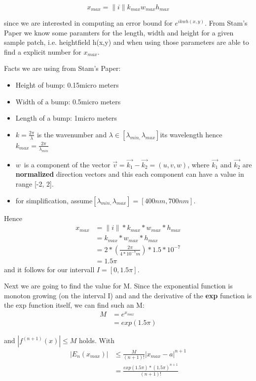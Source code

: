 \begin{equation*}
 x_{max} = \|i\| k_{max} w_{max} h_{max}
\end{equation*}

since we are interested in computing an error bound for $e^{ikwh(x,y)}$.
From Stam's Paper we know some paramters for the length, width and height for a given sample patch, i.e. heightfield
h(x,y) and when using those parameters are able to find a explicit
number for $x_{max}$.

Facts we are using from Stam's Paper:

\begin{itemize}
\item Height of bump: 0.15micro meters
\item Width of a bump: 0.5micro meters
\item Length of a bump: 1micro meters
\item $k=\frac{2\pi}{\lambda}$ is the wavenumber and $\lambda\in[\lambda_{min,}\lambda_{max}]$its
wavelength hence $k_{max}=\frac{2\pi}{\lambda_{min}}$ 
\item $w$~is a component of the vector $\vec{v}=\vec{k_{1}}-\vec{k_{2}}=(u,v,w)$,
where $\vec{k_{1}}$ and $\vec{k_{2}}$ are \textbf{normalized} direction
vectors and this each component can have a value in range {[}-2, 2{]}.
\item for simplification, assume$[\lambda_{min,}\lambda_{max}]=[400nm,700nm].$
\end{itemize}

Hence 
\begin{align*}
x_{max}
 &= \|i\|*k_{max}*w_{max}*h_{max} \\
 &= k_{max}*w_{max}*h_{max} \\
 &=2*(\frac{2\pi}{4*10^{-7}m})*1.5*10^{-7} \\
 &=1.5\pi
\end{align*}
and it follows for our intervall $I=[0,1.5\pi]$. 

Next we are going to find the value for M. Since the exponential function is monoton growing (on the interval I) and and the derivative of the \textbf{exp} function is the exp function itself, we can find such an M: 
\begin{align*}
 M
 &=e^{x_{max}} \\
 &=exp(1.5\pi)
\end{align*}

and $|f^{(n+1)}(x)|\leq M$ holds. With 
\begin{align*}
|E_{n}(x_{max})|
 &\leq\frac{M}{(n+1)!}|x_{max}-a|^{n+1} \\
 &= \frac{exp(1.5\pi)*(1.5\pi)^{n+1}}{(n+1)!}
\end{align*}

